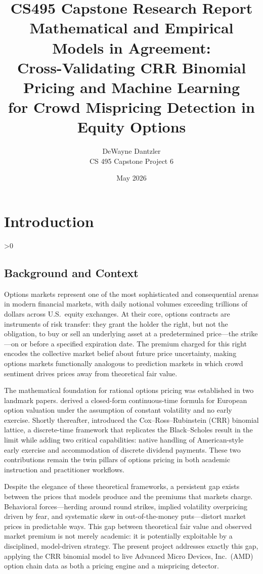 \documentclass[12pt, letterpaper]{article}
\title{
  \large CS495 Capstone Research Report \\[6pt]
  Mathematical and Empirical Models in Agreement:\\
  Cross-Validating CRR Binomial Pricing and Machine Learning\\
  for Crowd Mispricing Detection in Equity Options\\[6pt]
}
\author{DeWayne Dantzler \\[4pt] CS 495 Capstone Project 6}
\date{May 2026}
\let\oldsection\section
\renewcommand{\section}{\clearpage\oldsection}
\let\oldsubsection\subsection
\renewcommand{\subsection}{%
  \ifnum\value{subsection}>0 \clearpage\fi
  \oldsubsection
}
\begin{document}
\maketitle
\thispagestyle{empty}
\newpage

\tableofcontents
\newpage

\section{Introduction}

\subsection{Background and Context}

Options markets represent one of the most sophisticated and
consequential arenas in modern financial markets, with daily notional
volumes exceeding trillions of dollars across U.S.\ equity exchanges.
At their core, options contracts are instruments of risk transfer:
they grant the holder the right, but not the obligation, to buy or
sell an underlying asset at a predetermined price---the strike---on or
before a specified expiration date. The premium charged for this right
encodes the collective market belief about future price uncertainty,
making options markets functionally analogous to prediction markets in
which crowd sentiment drives prices away from theoretical fair value.

The mathematical foundation for rational options pricing was
established in two landmark papers. \citet{BlackScholes1973} derived a
closed-form continuous-time formula for European option valuation under
the assumption of constant volatility and no early exercise. Shortly
thereafter, \citet{Cox1979} introduced the Cox--Ross--Rubinstein (CRR)
binomial lattice, a discrete-time framework that replicates the
Black--Scholes result in the limit while adding two critical
capabilities: native handling of American-style early exercise and
accommodation of discrete dividend payments. These two contributions
remain the twin pillars of options pricing in both academic instruction
and practitioner workflows.

\newpage
Despite the elegance of these theoretical frameworks, a persistent gap
exists between the prices that models produce and the premiums that
markets charge. Behavioral forces---herding around round strikes,
implied volatility overpricing driven by fear, and systematic skew in
out-of-the-money puts---distort market prices in predictable ways.
This gap between theoretical fair value and observed market premium is
not merely academic: it is potentially exploitable by a disciplined,
model-driven strategy. The present project addresses exactly this gap,
applying the CRR binomial model to live Advanced Micro Devices, Inc.\
(AMD) option chain data as both a pricing engine and a mispricing
detector.
\end{document}
